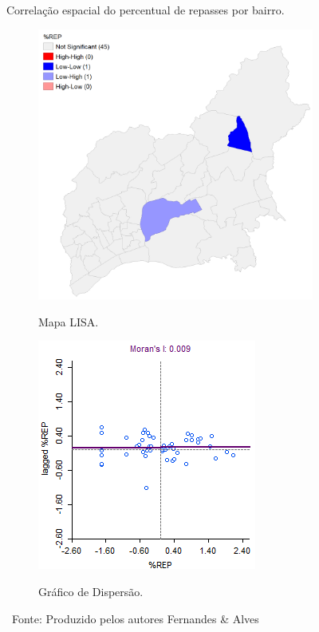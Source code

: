 \begin{figure}[htb]
     \caption{Correlação espacial do percentual de repasses por bairro.}
     \begin{subfigure}{.49\textwidth}
         \centering
         \caption{Mapa LISA.}
         \includegraphics[height=0.75\textwidth]{images/5_emp_bebidas/geoda/BairrosOSM_Corrigidos_REP_lisa.png}
         \label{fig:AMBEV_LISA_REP}
     \end{subfigure}
     \begin{subfigure}{.49\textwidth}
       \centering
       \caption{Gráfico de Dispersão.}
       \includegraphics[height=0.75\textwidth]{images/5_emp_bebidas/geoda/BairrosOSM_Corrigidos_REP_sct.png}
       \label{fig:AMBEV_SCT_REP}
     \end{subfigure}
     \caption*{\ Fonte: Produzido pelos autores Fernandes \& Alves}
 \end{figure} %

